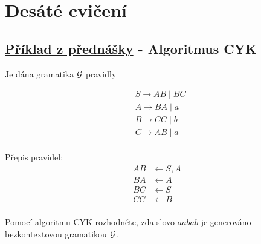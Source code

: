 \section{Desáté cvičení}

\subsection{\href{https://youtu.be/UfLaDffSpQU?list=PLQL6z4JeTTQkLuzI78OTnfYBclE1g0UjS&t=1317}{Příklad z přednášky} - Algoritmus CYK}
Je dána gramatika $\mathcal{G}$ pravidly
\begin{multicols}{2}

    \begin{align*}
        &S \rightarrow AB \mid BC \\
        &A \rightarrow BA \mid a \\
        &B \rightarrow CC \mid b \\
        &C \rightarrow AB \mid a \\
    \end{align*}

\columnbreak

    Přepis pravidel:
    \begin{align*}
        AB & \leftarrow S,A \\
        BA & \leftarrow A \\
        BC & \leftarrow S \\
        CC & \leftarrow B \\
    \end{align*}
\end{multicols}
Pomocí algoritmu CYK rozhodněte, zda slovo $aabab$ je generováno bezkontextovou gramatikou $\mathcal{G}$.

